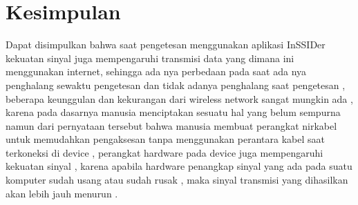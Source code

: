 \documentclass[conference]{IEEEtran}
\begin{document}
\section{Kesimpulan}
Dapat disimpulkan bahwa saat pengetesan menggunakan aplikasi InSSIDer kekuatan sinyal juga mempengaruhi transmisi data yang dimana ini menggunakan internet,
sehingga ada nya perbedaan pada saat ada nya penghalang sewaktu pengetesan dan tidak adanya penghalang saat pengetesan , beberapa keunggulan dan kekurangan dari wireless network 
sangat mungkin ada , karena pada dasarnya manusia menciptakan sesuatu hal yang belum sempurna namun dari pernyataan tersebut bahwa manusia membuat perangkat nirkabel untuk memudahkan pengaksesan 
tanpa menggunakan perantara kabel saat terkoneksi di device , perangkat hardware pada device juga mempengaruhi kekuatan sinyal , karena apabila hardware penangkap sinyal yang ada pada suatu 
komputer sudah usang atau sudah rusak , maka sinyal transmisi yang dihasilkan akan lebih jauh menurun .



\end{document}
